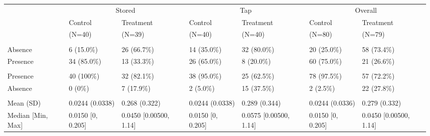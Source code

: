 \documentclass[
]{article}
\begin{document}
\begin{tabular}[t]{lllllll}
\toprule
\multicolumn{1}{c}{ } & \multicolumn{2}{c}{Stored} & \multicolumn{2}{c}{Tap} & \multicolumn{2}{c}{Overall} \\
\cmidrule(l{3pt}r{3pt}){2-3} \cmidrule(l{3pt}r{3pt}){4-5} \cmidrule(l{3pt}r{3pt}){6-7}
  & Control & Treatment & Control & Treatment & Control & Treatment\\
\midrule
 & (N=40) & (N=39) & (N=40) & (N=40) & (N=80) & (N=79)\\
\addlinespace[0.3em]
\multicolumn{7}{l}{\textbf{ec\_pa}}\\
\hspace{1em}Absence & 6 (15.0\%) & 26 (66.7\%) & 14 (35.0\%) & 32 (80.0\%) & 20 (25.0\%) & 58 (73.4\%)\\
\hspace{1em}Presence & 34 (85.0\%) & 13 (33.3\%) & 26 (65.0\%) & 8 (20.0\%) & 60 (75.0\%) & 21 (26.6\%)\\
\addlinespace[0.3em]
\multicolumn{7}{l}{\textbf{cf\_pa}}\\
\hspace{1em}Presence & 40 (100\%) & 32 (82.1\%) & 38 (95.0\%) & 25 (62.5\%) & 78 (97.5\%) & 57 (72.2\%)\\
\hspace{1em}Absence & 0 (0\%) & 7 (17.9\%) & 2 (5.0\%) & 15 (37.5\%) & 2 (2.5\%) & 22 (27.8\%)\\
\addlinespace[0.3em]
\multicolumn{7}{l}{\textbf{fc\_tap\_avg}}\\
\hspace{1em}Mean (SD) & 0.0244 (0.0338) & 0.268 (0.322) & 0.0244 (0.0338) & 0.289 (0.344) & 0.0244 (0.0336) & 0.279 (0.332)\\
\hspace{1em}Median [Min, Max] & 0.0150 [0, 0.205] & 0.0450 [0.00500, 1.14] & 0.0150 [0, 0.205] & 0.0575 [0.00500, 1.14] & 0.0150 [0, 0.205] & 0.0450 [0.00500, 1.14]\\
\bottomrule
\end{tabular}
\end{document}

